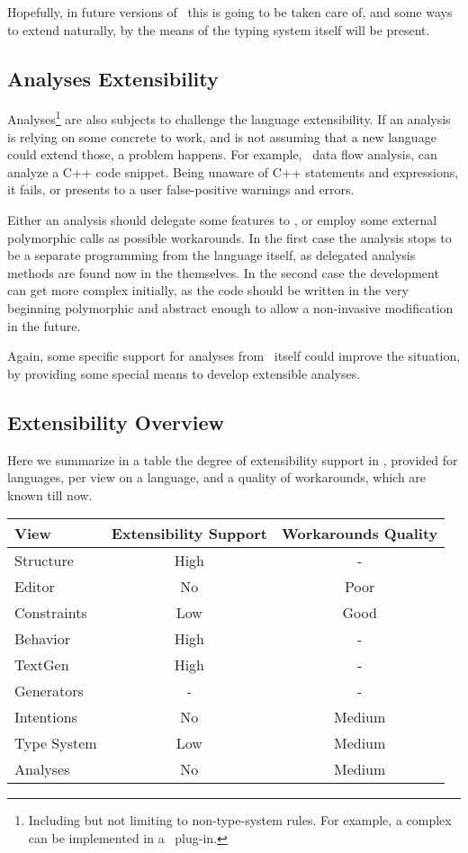 Hopefully, in  future versions of \jbmps\ this is going to be taken care of, and some ways to extend naturally, by the 
means of the typing system itself will be present.

\subsection{Analyses Extensibility}
\label{analysesext}

Analyses\footnote{Including but not limiting to non-type-system rules. For example, a complex  
can be implemented in a \jbmps\ plug-in.} are also subjects to challenge the language extensibility. If an analysis is relying on some concrete
 to work, and is not assuming that a new language could extend those, a problem happens.
For example, \mbdr\ data flow analysis, can analyze a C++ code snippet. Being unaware of C++ statements and expressions, it fails,
or presents to a user false-positive warnings and errors. 

Either an analysis should delegate some features to , or employ some external polymorphic calls as possible workarounds.
In the first case the analysis stops to be a separate programming from the language itself, as delegated analysis methods are found now
in the  themselves. In the second case the development can get more complex initially, as the code should be written 
in the very beginning polymorphic and abstract enough to allow a non-invasive modification in the future.


Again, some specific support for analyses from \jbmps\ itself could improve the situation, by providing some special means 
to develop extensible analyses.


\subsection{Extensibility Overview}

Here we summarize in a table the degree of extensibility support in \jbmps, provided for languages, per view on a language,
and a quality of workarounds, which are known till now.

\begin{center}
\begin{tabular}{l|c|c}
\textbf{View} & \textbf{Extensibility Support} & \textbf{Workarounds Quality} \\
\hline
Structure & High & -\\
Editor & No & Poor\\
Constraints & Low & Good\\
Behavior & High & -\\
TextGen & High & -\\
Generators & - & -\\
Intentions & No & Medium\\
Type System & Low & Medium\\
Analyses & No & Medium
\end{tabular}
\end{center}


